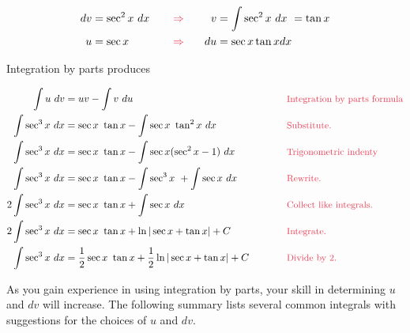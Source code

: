 \documentclass[12pt]{article}
\begin{document}
\begin{alignat*}{3}
dv &= \sec^2 x \ dx       &  \hspace{.3cm} &\color{mypink} \Rightarrow \color{black}   & \hspace{.5cm}  v&= \int \sec^2 x \ dx \ = \tan x \\
u &= \sec x &   &\color{mypink} \Rightarrow \color{black}   &   du&= \sec x \tan x dx \\
\end{alignat*}

\noindent Integration by parts produces

\begin{align*}
\int u \ dv &= uv - \int v \ du \hspace{5cm} &&\text{\color{mypink}\small Integration by parts formula}\color{black}\\
\int \sec^3 x \ dx &= \sec x \ \tan x - \int \sec x \ \tan^2 x \ dx  &&\text{\color{mypink}\small Substitute.}\color{black}\\
\int \sec^3 x \ dx &= \sec x \ \tan x - \int \sec x (\sec^2 x - 1) \ dx  &&\text{\color{mypink}\small Trigonometric indenty}\color{black}\\
\int \sec^3 x \ dx &= \sec x \ \tan x - \int \sec^3 x \ + \int \sec x \ dx  &&\text{\color{mypink}\small Rewrite.}\color{black}\\
2 \int \sec^3 x \ dx &= \sec x \ \tan x + \int \sec x \ dx  &&\text{\color{mypink}\small Collect like integrals.}\color{black}\\
2 \int \sec^3 x \ dx &= \sec x \ \tan x + \ln |\sec x + \tan x| + C  &&\text{\color{mypink}\small Integrate.}\color{black}\\
\int \sec^3 x \ dx &= \frac{1}{2} \sec x \ \tan x + \frac{1}{2}\ln |\sec x + \tan x| + C  &&\text{\color{mypink}\small Divide by 2.}\color{black}\\
\end{align*}

As you gain experience in using integration by parts, your skill in determining $u$ and $dv$ will increase. The following summary lists several common integrals with suggestions for the choices of $u$ and $dv$.
\end{document}
